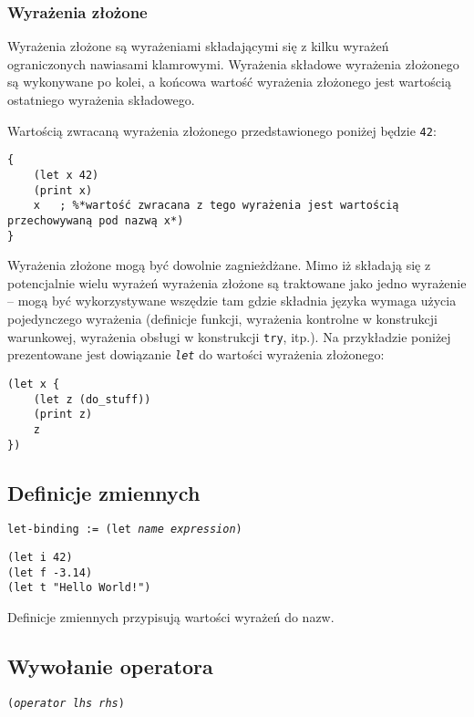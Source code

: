 \subsubsection{Wyrażenia złożone}

Wyrażenia złożone są wyrażeniami składającymi się z kilku wyrażeń ograniczonych nawiasami klamrowymi.
Wyrażenia składowe wyrażenia złożonego są wykonywane po kolei, a końcowa wartość wyrażenia złożonego jest
wartością ostatniego wyrażenia składowego.

Wartością zwracaną wyrażenia złożonego przedstawionego poniżej będzie \texttt{42}:

\begin{lstlisting}
{
    (let x 42)
    (print x)
    x   ; %*wartość zwracana z tego wyrażenia jest wartością przechowywaną pod nazwą x*)
}
\end{lstlisting}

Wyrażenia złożone mogą być dowolnie zagnieżdżane. Mimo iż składają się z potencjalnie wielu wyrażeń
wyrażenia złożone są traktowane jako jedno wyrażenie -- mogą być wykorzystywane wszędzie tam gdzie składnia
języka wymaga użycia pojedynczego wyrażenia (definicje funkcji, wyrażenia kontrolne w konstrukcji warunkowej,
wyrażenia obsługi w konstrukcji \texttt{try}, itp.). Na przykładzie poniżej prezentowane jest dowiązanie
\emph{\texttt{let}} do wartości wyrażenia złożonego:

\begin{lstlisting}
(let x {
    (let z (do_stuff))
    (print z)
    z
})
\end{lstlisting}

\subsection{Definicje zmiennych}

\texttt{let-binding := (let \emph{name} \emph{expression})}

\begin{lstlisting}
(let i 42)
(let f -3.14)
(let t "Hello World!")
\end{lstlisting}

Definicje zmiennych przypisują wartości wyrażeń do nazw.

\subsection{Wywołanie operatora}

\texttt{(\emph{operator} \emph{lhs} \emph{rhs})}

